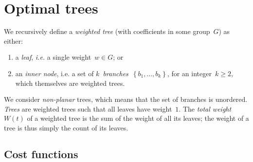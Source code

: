 \documentclass{article}
\def\pcost{ν_\mathrm{p}}
\def\scost{ν_\mathrm{c}}
\def\treefrom#1{\left\{#1\right\}}
\begin{document}
\section{Optimal trees}


\begin{df}
We recursively define a \emph{weighted tree} (with coefficients in some
group~$G$) as either:
\begin{enumerate}
\item a \emph{leaf}, \emph{i.e.} a single weight~$w ∈ G$; or
\item an \emph{inner node}, i.e. a set of
$k$~\emph{branches}~$\treefrom{b_1, …, b_k}$, for an integer~$k ≥ 2$,
which themselves are weighted trees.
\end{enumerate}
\end{df}

We consider \emph{non-planar} trees,
which means that the set of branches is unordered.
\emph{Trees} are weighted trees such that all leaves have weight~$1$.
The \emph{total weight}~$W(t)$ of a weighted tree is
the sum of the weight of all its leaves;
the weight of a tree is thus simply the count of its leaves.


% 

\subsection{Cost functions}
\end{document}

